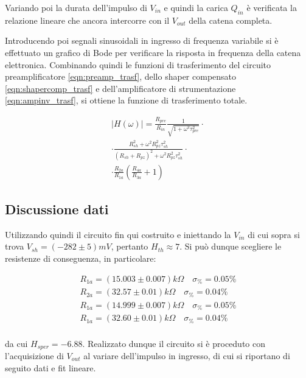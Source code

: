 \documentclass{article}
\begin{document}
Variando poi la durata dell'impulso di $V_{in}$ e quindi la carica $Q_{in}$ è verificata la relazione lineare che ancora
intercorre con il $V_{out}$ della catena completa.

Introducendo poi segnali sinusoidali in ingresso di frequenza variabile si è effettuato un grafico di Bode per verificare la risposta
in frequenza della catena elettronica. Combinando quindi le funzioni di trasferimento del circuito preamplificatore 
\ref{eqn:preamp_trasf}, dello shaper compensato \ref{eqn:shapercomp_trasf} e dell'amplificatore di strumentazione 
\ref{eqn:ampinv_trasf}, si ottiene la funzione di trasferimento totale.

\begin{multline}
    \label{eqn:catena_trasf}
    |H(\omega)| = \frac{R_{pre}}{R_{in}} \frac{1}{\sqrt{1+\omega^2\tau_{pre}^2}} \cdot \\
    \cdot \frac{R_{sh}^2 + \omega^2 R_{pz}^2 \tau_{sh}^2}{(R_{sh}+R_{pz})^2 + \omega^2 R_{pz}^2 \tau_{sh}^2} \cdot \\
    \cdot \frac{R_{2a}}{R_{1a}} \left( \frac{R_{4a}}{R_{3a}} + 1 \right)
\end{multline}

\subsection{Discussione dati}

Utilizzando quindi il circuito fin qui costruito e iniettando la $V_{in}$ di cui sopra si trova $V_{sh} = (-282 \pm 5) mV$, pertanto
$H_{th} \approx 7$. Si può dunque scegliere le resistenze di conseguenza, in particolare:

\begin{align*}
    R_{1a} = (15.003 \pm 0.007) k\Omega \quad \sigma_{\%} = 0.05\% \\
    R_{2a} = (32.57 \pm 0.01) k\Omega \quad \sigma_{\%} = 0.04\% \\
    R_{1a} = (14.999 \pm 0.007) k\Omega \quad \sigma_{\%} = 0.05\% \\
    R_{1a} = (32.60 \pm 0.01) k\Omega \quad \sigma_{\%} = 0.04\% \\
\end{align*}

da cui $H_{sper}=-6.88$. Realizzato dunque il circuito si è proceduto con l'acquisizione di $V_{out}$ al variare dell'impulso in
ingresso, di cui si riportano di seguito dati e fit lineare.
\end{document}
